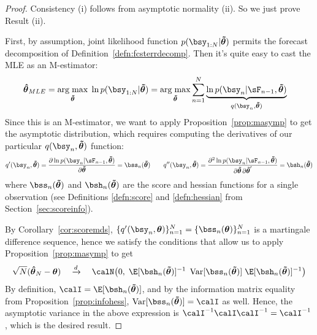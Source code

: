 \documentclass[12pt]{article}
\theoremstyle{plain}
\theoremstyle{definition}
\theoremstyle{remark}
\newcommand{\bstheta}{\boldsymbol{\theta}}
\newcommand{\bshattheta}{\boldsymbol{\hat{\theta}}}
\newcommand{\bstildetheta}{\boldsymbol{\tilde{\theta}}}
\DeclareMathOperator*{\argmax}{arg\;max}
\newcommand{\Var}{\operatorname{Var}}
\newcommand{\dto}{\xrightarrow{d}}
\newcommand{\sumnN}{\sum^N_{n=1}}
\newcommand{\nN}{_{n=1}^N}
\begin{document}
\begin{proof}
Consistency (i) follows from asymptotic normality (ii). So we just prove
Result (ii).

First, by assumption, joint likelihood function
$p(\bsy_{1:N}|\bstildetheta)$ permits the forecast decomposition of
Definition~\ref{defn:fcsterrdecomp}.
Then it's quite easy to cast the MLE as an M-estimator:
\begin{align*}
  \bshattheta_{MLE}
  =
  \argmax_{\bstildetheta} \;
  \ln p(\bsy_{1:N}|\bstildetheta)
  &=
  \argmax_{\bstildetheta}
  \sumnN
  \underbrace{%
    \ln p(\bsy_{n}|\sF_{n-1},\bstildetheta)
  }_{q(\bsy_n,\bstildetheta)}
\end{align*}
Since this is an M-estimator, we want to apply
Proposition~\ref{prop:masymp} to get the asymptotic distribution, which
requires computing the derivatives of our particular
$q(\bsy_n,\bstildetheta)$ function:
\begin{align*}
  q'(\bsy_n,\bstildetheta)
  =
  \frac{\partial \ln p(\bsy_n|\sF_{n-1},\bstildetheta)}{\partial \bstildetheta}
  = \bss_n(\bstildetheta)
  \qquad
  q''(\bsy_n,\bstildetheta)
  =
  \frac{\partial^2 \ln p(\bsy_n|\sF_{n-1},\bstildetheta)}{%
    \partial\bstildetheta\,\partial\bstildetheta'}
  = \bsh_n(\bstildetheta)
\end{align*}
where $\bss_n(\bstildetheta)$ and $\bsh_n(\bstildetheta)$ are the score
and hessian functions for a single observation
(see Definitions \ref{defn:score} and \ref{defn:hessian} from
Section~\ref{sec:scoreinfo}).

By Corollary~\ref{cor:scoremds},
$\{q'(\bsy_n,\bstheta)\}\nN=\{\bss_n(\bstheta)\}\nN$ is a martingale
difference sequence, hence we satisfy the conditions that allow us to
apply Proposition~\ref{prop:masymp} to get
\begin{align*}
  \sqrt{N}(\bshattheta_N-\bstheta)
  \quad\dto\quad
  \calN\big(0,\;
  \E[\bsh_n(\bstildetheta)]^{-1}
  \;
  \Var[\bss_n(\bstildetheta)]
  \;
  \E[\bsh_n(\bstildetheta)]^{-1}
  \big)
\end{align*}
By definition,
$\calI= \E[\bsh_n(\bstildetheta)]$,
and by the information matrix equality from
Proposition~\ref{prop:infohess},
$\Var[\bss_n(\bstildetheta)]=\calI$ as well.
Hence, the asymptotic variance in the above expression is
$\calI^{-1}\calI\calI^{-1}=\calI^{-1}$, which is the desired result.


\end{proof}
\end{document}
